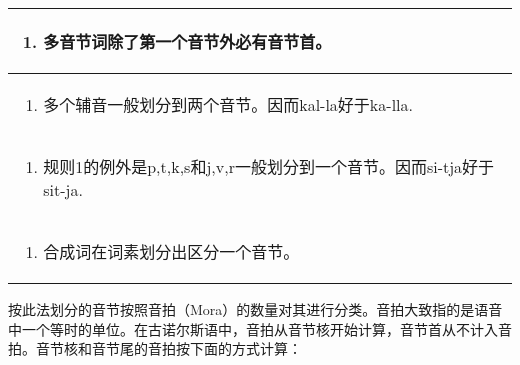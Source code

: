 \begin{longtable}{l}
  \toprule
  \begin{enumerate}\def\labelenumi{\arabic{enumi}.}\item  多音节词除了第一个音节外必有音节首。\end{enumerate} \\
  \midrule
  \endhead
  \bottomrule
  \endfoot
  \begin{minipage}[t]{\linewidth}\raggedright
    \begin{enumerate}
      \def\labelenumi{\arabic{enumi}.}
      \setcounter{enumi}{1}
      \item
            多个辅音一般划分到两个音节。因而kal-la好于ka-lla.
    \end{enumerate}
  \end{minipage}                                                                          \\
  \begin{minipage}[t]{\linewidth}\raggedright
    \begin{enumerate}
      \def\labelenumi{\arabic{enumi}.}
      \setcounter{enumi}{2}
      \item
            规则1的例外是p,t,k,s和j,v,r一般划分到一个音节。因而si-tja好于sit-ja.
    \end{enumerate}
  \end{minipage}                                                                          \\
  \begin{minipage}[t]{\linewidth}\raggedright
    \begin{enumerate}
      \def\labelenumi{\arabic{enumi}.}
      \setcounter{enumi}{3}
      \item
            合成词在词素划分出区分一个音节。
    \end{enumerate}
  \end{minipage}                                                                          \\
\end{longtable}

按此法划分的音节按照音拍（Mora）的数量对其进行分类。音拍大致指的是语音中一个等时的单位。在古诺尔斯语中，音拍从音节核开始计算，音节首从不计入音拍。音节核和音节尾的音拍按下面的方式计算：

